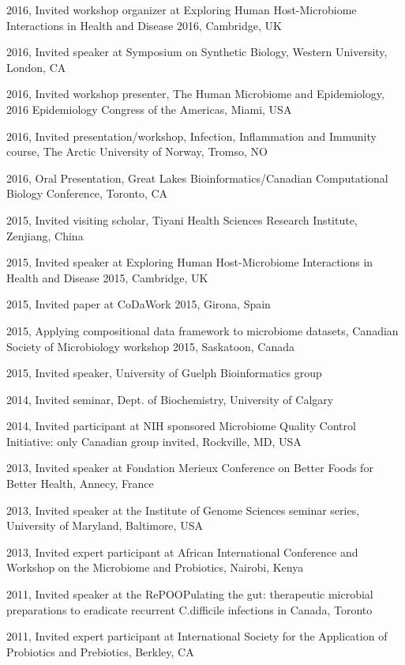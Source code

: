 \documentclass[11pt]{article}
\begin{document}
\begin{description}
\item 2016,  Invited workshop organizer at Exploring Human Host-Microbiome Interactions in Health and Disease 2016, Cambridge, UK 
\item 2016,	 Invited speaker at Symposium on Synthetic Biology, Western University, London,  CA
\item 2016,  Invited workshop presenter, The Human Microbiome and Epidemiology, 2016 Epidemiology Congress of the Americas, Miami, USA
\item 2016,  Invited presentation/workshop, Infection, Inflammation and Immunity course, The Arctic University of Norway, Tromso, NO
\item 2016,  Oral Presentation, Great Lakes Bioinformatics/Canadian Computational Biology Conference, Toronto, CA
\item 2015, Invited visiting scholar, Tiyani Health Sciences Research Institute, Zenjiang, China
\item 2015,  Invited speaker at Exploring Human Host-Microbiome Interactions in Health and Disease 2015, Cambridge, UK
\item 2015,  Invited paper at CoDaWork 2015, Girona, Spain
\item 2015,  Applying compositional data framework to microbiome datasets,  Canadian Society of Microbiology workshop 2015, Saskatoon, Canada
\item 2015,  Invited speaker, University of Guelph Bioinformatics group
\item 2014,     Invited seminar, Dept. of Biochemistry, University of Calgary
\item 2014, 	Invited participant at NIH sponsored Microbiome Quality Control Initiative: only Canadian group invited, Rockville, MD, USA
\item 2013, 	Invited speaker at Fondation Merieux Conference on Better Foods for Better Health, Annecy, France
\item 2013, 	Invited speaker at the Institute of Genome Sciences seminar series, University of Maryland, Baltimore, USA
\item 2013, 	Invited expert participant at African International Conference and Workshop on the Microbiome and Probiotics, Nairobi, Kenya
\item 2011, 	Invited speaker at the RePOOPulating the gut: therapeutic microbial preparations to eradicate recurrent C.difficile infections in Canada, Toronto
\item 2011, 	Invited expert participant at International Society for the Application of Probiotics and Prebiotics, Berkley, CA

\end{description}
\end{document}
